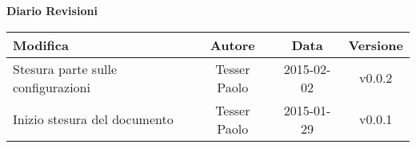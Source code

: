 %

\begin{center}
\begin{small}
	\textbf{\huge Diario Revisioni}
	\vspace{0.5cm}
	\begin{longtable}{|p{6cm}|c|c|c|}
		\hline
		\textbf{Modifica} & \textbf{Autore} & \textbf{Data} & \textbf{Versione} \\
		\hline
		Stesura parte sulle configurazioni & Tesser Paolo & 2015-02-02 & v0.0.2 \\
		\hline
		Inizio stesura del documento & Tesser Paolo & 2015-01-29 & v0.0.1 \\
		\hline
	\end{longtable}

\end{small}
\end{center}